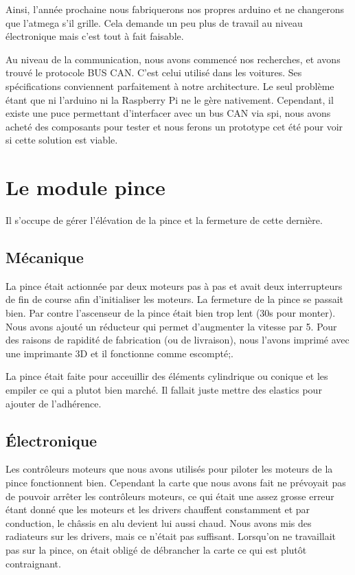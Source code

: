 Ainsi, l'année prochaine nous fabriquerons nos propres arduino et ne changerons que l'atmega s'il grille. Cela demande un peu plus de travail au niveau électronique mais c'est tout à fait faisable.

Au niveau de la communication, nous avons commencé nos recherches, et avons trouvé le protocole BUS CAN. C'est celui utilisé dans les voitures. Ses spécifications conviennent parfaitement à notre architecture. Le seul problème étant que ni l'arduino ni la Raspberry Pi ne le gère nativement. Cependant, il existe une puce permettant d'interfacer avec un bus CAN via spi, nous avons acheté des composants pour tester et nous ferons un prototype cet été pour voir si cette solution est viable.

\section{Le module pince}
Il s'occupe de gérer l'élévation de la pince et la fermeture de cette dernière.

\subsection{Mécanique}
La pince était actionnée par deux moteurs pas à pas et avait deux interrupteurs de fin de course afin d'initialiser les moteurs. La fermeture de la pince se passait bien. Par contre l'ascenseur de la pince était bien trop lent (30s pour monter). Nous avons ajouté un réducteur qui permet d'augmenter la vitesse par 5. Pour des raisons de rapidité de fabrication (ou de livraison), nous l'avons imprimé avec une imprimante 3D et il fonctionne comme escompté;.

La pince était faite pour acceuillir des éléments cylindrique ou conique et les empiler ce qui a plutot bien marché. Il fallait juste mettre des elastics pour ajouter de l'adhérence.

\subsection{Électronique}
Les contrôleurs moteurs que nous avons utilisés pour piloter les moteurs de la pince fonctionnent bien. Cependant la carte que nous avons fait ne prévoyait pas de pouvoir arrêter les contrôleurs moteurs, ce qui était une assez grosse erreur étant donné que les moteurs et les drivers chauffent constamment et par conduction, le châssis en alu devient lui aussi chaud. Nous avons mis des radiateurs sur les drivers, mais ce n'était pas suffisant. Lorsqu'on ne travaillait pas sur la pince, on était obligé de débrancher la carte ce qui est plutôt contraignant.

